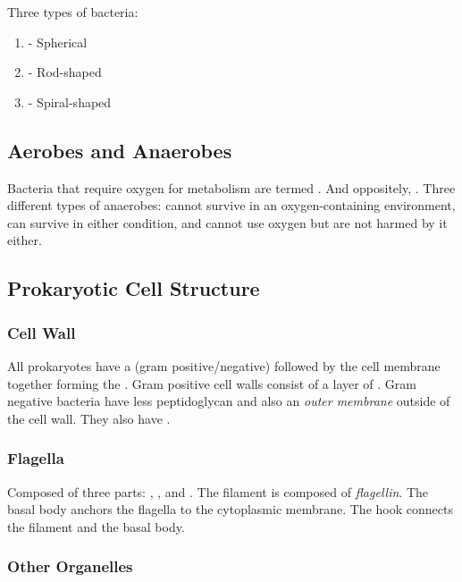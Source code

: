 \documentclass[../Bio_chemistryReview.tex]{subfiles}
\begin{document}
Three types of bacteria: \begin{enumerate} \item {} -
    Spherical \item {} - Rod-shaped \item
       - Spiral-shaped \end{enumerate}

\subsection{Aerobes and Anaerobes\supdag}

Bacteria that require oxygen for metabolism are termed .
And oppositely, . Three different types of anaerobes:
 cannot survive in an oxygen-containing
environment,  can survive in either
condition, and  cannot use oxygen but
are not harmed by it either.

\subsection{Prokaryotic Cell Structure\supdag}

\subsubsection{Cell Wall\supdag}

All prokaryotes have a (gram positive/negative) followed by the
cell membrane together forming the . Gram positive cell walls
consist of a layer of . Gram negative bacteria have less
peptidoglycan and also an \emph{outer membrane} outside of the cell wall. They
also have .

\subsubsection{Flagella\supdag}

Composed of three parts: , , and . The filament is composed of
\emph{flagellin}. The basal body anchors the flagella to the cytoplasmic
membrane. The hook connects the filament and the basal body.

\subsubsection{Other Organelles\supdag}
\end{document}
